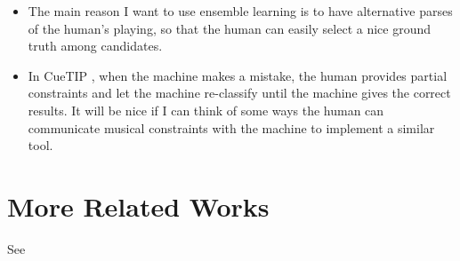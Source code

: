 \documentclass{article}
\begin{document}
\begin{enumerate}
\begin{itemize}
\item The main reason I want to use ensemble learning is to have alternative parses of the human’s playing, so that the human can easily select a nice ground truth among candidates. 
\item In CueTIP \cite{cueTip}, when the machine makes a mistake, the human provides partial constraints and let the machine re-classify until the machine gives the correct results. It will be nice if I can think of some ways the human can communicate musical constraints with the machine to implement a similar tool. 
\end{itemize}
\end{enumerate}

\section{More Related Works}
See \cite{bci_direction, bci_ml, ecog_speech, high_level_knob, hand_pose, glove_talk_ii}

{}

\end{document}
